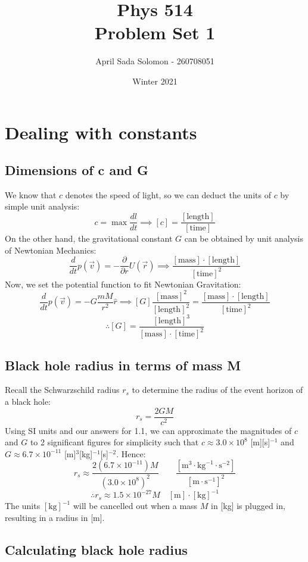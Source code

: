 \documentclass{article}
\title{Phys 514 \\
	\large Problem Set 1}
\author{April Sada Solomon - 260708051}
\date{Winter 2021}
\begin{document}
	\maketitle
	\newpage
	\tableofcontents
	\newpage
	
	\setcounter{page}{1}
	\cfoot{\thepage}
	\section{Dealing with constants}
	\subsection{Dimensions of c and G}
		We know that $c$ denotes the speed of light, so we can deduct the units of $c$ by simple unit analysis:
		$$ c = \max \frac{dl}{dt} \implies \boxed{[c] = \frac{[\text{length}]}{[\text{time}]}}$$
		On the other hand, the gravitational constant $G$ can be obtained by unit analysis of Newtonian Mechanics:
		$$
			\frac{d}{dt} p(\vec{v}) = - \frac{\partial}{\partial r} U \left( \vec{r} \right) \implies \frac{[\text{mass}]\cdot[\text{length}]}{[\text{time}]^2}
		$$
		Now, we set the potential function to fit Newtonian Gravitation:
		$$ \frac{d}{dt} p(\vec{v}) = -G \frac{m M}{r^2} \hat{r} \implies [G] \frac{[\text{mass}]^2}{[\text{length}]^2} = \frac{[\text{mass}]\cdot[\text{length}]}{[\text{time}]^2}$$
		$$ \therefore \boxed{[G] = \frac{[\text{length}]^3}{[\text{mass}] \cdot [\text{time}]^2}} $$
	\subsection{Black hole radius in terms of mass M}
		Recall the Schwarzschild radius $r_s$ to determine the radius of the event horizon of a black hole:
		$$ r_s = \frac{2GM}{c^2} $$
		Using SI units and our answers for 1.1, we can approximate the magnitudes of $c$ and $G$ to 2 significant figures for simplicity such that $c \approx 3.0 \times 10^8$ [m][s]$^{-1}$ and $G \approx 6.7 \times 10^{-11}$ [m]$^3$[kg]$^{-1}$[s]$^{-2}$. Hence:
		$$ r_s \approx \frac{2 (6.7 \times 10^{-11})M}{(3.0 \times 10^{8})^2} \quad\quad \frac{[\text{m}^3 \cdot \text{kg}^{-1} \cdot \text{s}^{-2}]}{[\text{m}\cdot\text{s}^{-1}]^2}$$
		$$ \therefore \boxed{r_s \approx 1.5 \times 10^{-27} M \quad [\text{m}]\cdot[\text{kg}]^{-1}}$$
		The units $[\text{kg}]^{-1}$ will be cancelled out when a mass $M$ in [kg] is plugged in, resulting in a radius in [m].
	\subsection{Calculating black hole radius}
\end{document}
